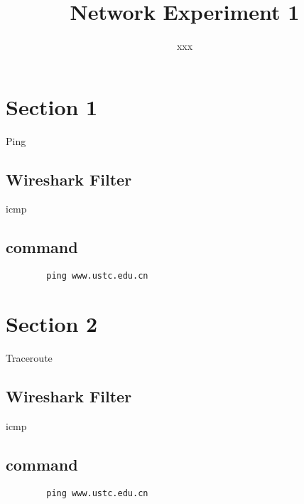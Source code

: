 \documentclass[UTF8]{article}
\title{Network Experiment 1}
\author{xxx}
\begin{document}
\maketitle

\section{Section 1}
Ping
\subsection{Wireshark Filter}
icmp
\subsection{command}
\begin{center}
    \begin{verbatim}
        ping www.ustc.edu.cn
    \end{verbatim}
\end{center}

\section{Section 2}
Traceroute
\subsection{Wireshark Filter}
icmp
\subsection{command}
\begin{center}
    \begin{verbatim}
        ping www.ustc.edu.cn
    \end{verbatim}
\end{center}
\end{document}
